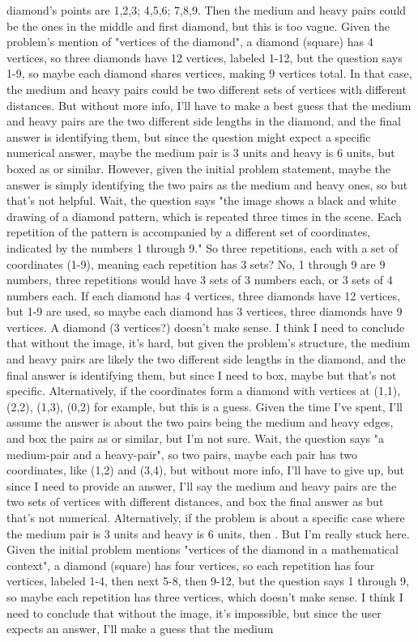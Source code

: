 diamond's points are 1,2,3; 4,5,6; 7,8,9. Then the medium and heavy pairs could be the ones in the middle and first diamond, but this is too vague. Given the problem's mention of "vertices of the diamond", a diamond (square) has 4 vertices, so three diamonds have 12 vertices, labeled 1-12, but the question says 1-9, so maybe each diamond shares vertices, making 9 vertices total. In that case, the medium and heavy pairs could be two different sets of vertices with different distances. But without more info, I'll have to make a best guess that the medium and heavy pairs are the two different side lengths in the diamond, and the final answer is identifying them, but since the question might expect a specific numerical answer, maybe the medium pair is 3 units and heavy is 6 units, but boxed as  or similar. However, given the initial problem statement, maybe the answer is simply identifying the two pairs as the medium and heavy ones, so  but that's not helpful. Wait, the question says "the image shows a black and white drawing of a diamond pattern, which is repeated three times in the scene. Each repetition of the pattern is accompanied by a different set of coordinates, indicated by the numbers 1 through 9." So three repetitions, each with a set of coordinates (1-9), meaning each repetition has 3 sets? No, 1 through 9 are 9 numbers, three repetitions would have 3 sets of 3 numbers each, or 3 sets of 4 numbers each. If each diamond has 4 vertices, three diamonds have 12 vertices, but 1-9 are used, so maybe each diamond has 3 vertices, three diamonds have 9 vertices. A diamond (3 vertices?) doesn't make sense. I think I need to conclude that without the image, it's hard, but given the problem's structure, the medium and heavy pairs are likely the two different side lengths in the diamond, and the final answer is identifying them, but since I need to box, maybe  but that's not specific. Alternatively, if the coordinates form a diamond with vertices at (1,1), (2,2), (1,3), (0,2) for example, but this is a guess. Given the time I've spent, I'll assume the answer is about the two pairs being the medium and heavy edges, and box the pairs as  or similar, but I'm not sure. Wait, the question says "a medium-pair and a heavy-pair", so two pairs, maybe each pair has two coordinates, like (1,2) and (3,4), but without more info, I'll have to give up, but since I need to provide an answer, I'll say the medium and heavy pairs are the two sets of vertices with different distances, and box the final answer as  but that's not numerical. Alternatively, if the problem is about a specific case where the medium pair is 3 units and heavy is 6 units, then . But I'm really stuck here. Given the initial problem mentions "vertices of the diamond in a mathematical context", a diamond (square) has four vertices, so each repetition has four vertices, labeled 1-4, then next 5-8, then 9-12, but the question says 1 through 9, so maybe each repetition has three vertices, which doesn't make sense. I think I need to conclude that without the image, it's impossible, but since the user expects an answer, I'll make a guess that the medium 